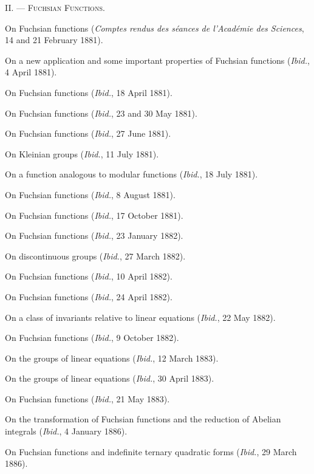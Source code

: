 \documentclass[11pt]{article}
\begin{document}
\begin{center}
{\scshape II. — Fuchsian Functions.}
\end{center}

\begin{description}[leftmargin=3.4em,labelwidth=2.8em,style=nextline]
\item[6.] On Fuchsian functions (\emph{Comptes rendus des séances de l’Académie des Sciences}, 14 and 21 February 1881).
\item[9.] On a new application and some important properties of Fuchsian functions (\emph{Ibid.}, 4 April 1881).
\item[11.] On Fuchsian functions (\emph{Ibid.}, 18 April 1881).
\item[13.] On Fuchsian functions (\emph{Ibid.}, 23 and 30 May 1881).
\item[15.] On Fuchsian functions (\emph{Ibid.}, 27 June 1881).
\item[16.] On Kleinian groups (\emph{Ibid.}, 11 July 1881).
\item[17.] On a function analogous to modular functions (\emph{Ibid.}, 18 July 1881).
\item[18.] On Fuchsian functions (\emph{Ibid.}, 8 August 1881).
\item[19.] On Fuchsian functions (\emph{Ibid.}, 17 October 1881).
\item[22.] On Fuchsian functions (\emph{Ibid.}, 23 January 1882).
\item[25.] On discontinuous groups (\emph{Ibid.}, 27 March 1882).
\item[26.] On Fuchsian functions (\emph{Ibid.}, 10 April 1882).
\item[27.] On Fuchsian functions (\emph{Ibid.}, 24 April 1882).
\item[28.] On a class of invariants relative to linear equations (\emph{Ibid.}, 22 May 1882).
\item[30.] On Fuchsian functions (\emph{Ibid.}, 9 October 1882).
\item[34.] On the groups of linear equations (\emph{Ibid.}, 12 March 1883).
\item[36.] On the groups of linear equations (\emph{Ibid.}, 30 April 1883).
\item[37.] On Fuchsian functions (\emph{Ibid.}, 21 May 1883).
\item[59.] On the transformation of Fuchsian functions and the reduction of Abelian integrals (\emph{Ibid.}, 4 January 1886).
\item[61.] On Fuchsian functions and indefinite ternary quadratic forms (\emph{Ibid.}, 29 March 1886).

\end{description}
\end{document}
